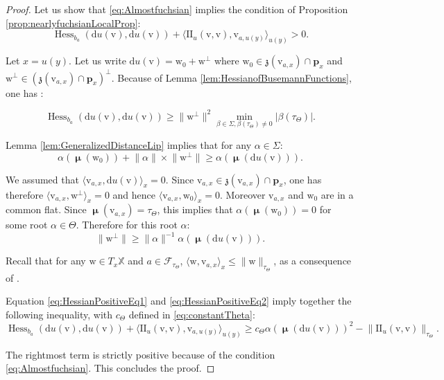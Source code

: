 \documentclass[reqno,10pt]{amsart}
\theoremstyle{plain}
\theoremstyle{definition}
\theoremstyle{remark}
\newcommand{\type}{\tau}
\DeclareMathOperator{\Cartan}{\boldsymbol{\mu}}
\DeclareMathOperator{\Hess}{Hess}
\newcommand{\II}{\mathrm{I\!I}}
\newcommand{\X}{\mathbb{X}}
\begin{document}
\begin{proof}

Let us show that \eqref{eq:Almostfuchsian} implies the condition of Proposition \ref{prop:nearlyfuchsianLocalProp}: 
$$\Hess_{b_a}(\mathrm{d}u(\mathrm{v}),\mathrm{d}u(\mathrm{v}))+\langle\II_u(\mathrm{v},\mathrm{v}),\mathrm{v}_{a,u(y)}\rangle_{u(y)}>0. $$


\medskip

Let $x=u(y)$. Let us write $\mathrm{d}u(\mathrm{v})=\mathrm{w}_0+\mathrm{w}^\perp$ where $\mathrm{w}_0\in \mathfrak{z}(\mathrm{v}_{a,x})\cap \mathbf{p}_x$ and $\mathrm{w}^\perp\in (\mathfrak{z}(\mathrm{v}_{a,x})\cap \mathbf{p}_x)^\perp$. Because of Lemma \ref{lem:HessianofBusemannFunctions}, one has :

\begin{equation}
\label{eq:HessianPositiveEq1}
\Hess_{b_{a}}\left(\mathrm{d}u(\mathrm{v}),\mathrm{d}u(\mathrm{v})\right)\geq\lVert\mathrm{w}^\perp\rVert^2 \min_{\beta\in \Sigma, \beta(\type_\Theta)\neq 0}|\beta(\type_\Theta)|.
\end{equation}

Lemma \ref{lem:GeneralizedDistanceLip} implies that for any $\alpha\in \Sigma$:
$$\alpha(\Cartan(\mathrm{w}_0))+\lVert\alpha\rVert\times \lVert\mathrm{w}^\perp\rVert\geq \alpha(\Cartan(\mathrm{d}u(\mathrm{v}))).$$ 

\medskip

We assumed that $\langle \mathrm{v}_{a,x},\mathrm{d}u(\mathrm{v})\rangle_x=0$. Since $\mathrm{v}_{a,x}\in \mathfrak{z}(\mathrm{v}_{a,x})\cap \mathbf{p}_x$, one has therefore $\langle \mathrm{v}_{a,x},\mathrm{w}^\perp\rangle_x=0$ and hence $\langle \mathrm{v}_{a,x},\mathrm{w}_0\rangle_x=0$. Moreover $\mathrm{v}_{a,x}$ and $\mathrm{w}_0$ are in a common flat. Since $\Cartan(\mathrm{v}_{a,x})=\type_\Theta$, this implies that $\alpha(\Cartan(\mathrm{w}_0))=0$ for some root $\alpha\in \Theta$. Therefore for this root $\alpha$:
\begin{equation}
\label{eq:HessianPositiveEq2}
\lVert\mathrm{w}^\perp\rVert\geq \lVert\alpha\rVert^{-1}\alpha(\Cartan(\mathrm{d}u(\mathrm{v}))).
\end{equation}

Recall that for any $\mathrm{w}\in T_x\X$ and $a\in \mathcal{F}_{\type_\Theta}$,  $\langle \mathrm{w},\mathrm{v}_{a,x}\rangle_x\leq \lVert\mathrm{w}\rVert_{{\type_\Theta}}$, as a consequence of \cite[Proposition 24]{Eberlein}.

Equation \eqref{eq:HessianPositiveEq1} and \eqref{eq:HessianPositiveEq2} imply together the following inequality, with $c_\Theta$ defined in \eqref{eq:constantTheta}:
$$\Hess_{b_a}\left(\mathrm{d}u(\mathrm{v}),\mathrm{d}u(\mathrm{v})\right)+\langle\II_u(\mathrm{v},\mathrm{v}),\mathrm{v}_{a,u(y)}\rangle_{u(y)}\geq c_\Theta\alpha(\Cartan(\mathrm{d}u(\mathrm{v})))^2-\lVert\II_u(\mathrm{v},\mathrm{v})\rVert_{\type_\Theta}.$$

The rightmost term is strictly positive because of the condition \eqref{eq:Almostfuchsian}. This concludes the proof.
\end{proof}
\end{document}
